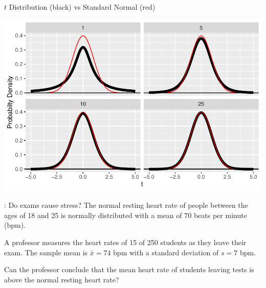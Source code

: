 \begin{frame}
  \begin{block}{$t$ Distribution (black) vs Standard Normal (red)}
  \begin{center}
    \includegraphics[height = .75\textheight]{figure/t-1}
  \end{center}
  \end{block}
\end{frame}

\begin{frame}
  
  \begin{block}{\examplectd: Do exams cause stress?}
  The normal resting heart rate of people between the ages of 18 and 25 is normally distributed with a mean of 70 beats per minute (bpm).
  
  \medskip
  
  A professor measures the heart rates of 15 of 250 students as they leave their exam. The sample mean is $\bar x=74$ bpm with a standard deviation of $s=7$ bpm. 
  
  \medskip
  
  Can the professor conclude that the mean heart rate of students leaving tests is above the normal resting heart rate? 
  
  \end{block}
\end{frame}



